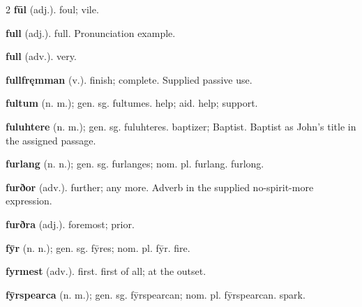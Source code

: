 \begin{multicols*}{2}
\textbf{fūl} (adj.). foul; vile.\par
\textbf{full} (adj.). full. Pronunciation example.\par
\textbf{full} (adv.). very.\par
\textbf{fullfręmman} (v.). finish; complete. Supplied passive use.\par
\textbf{fultum} (n. m.); gen. sg. fultumes. help; aid. help; support.\par
\textbf{fuluhtere} (n. m.); gen. sg. fuluhteres. baptizer; Baptist. Baptist as John's title in the assigned passage.\par
\textbf{furlang} (n. n.); gen. sg. furlanges; nom. pl. furlang. furlong.\par
\textbf{furðor} (adv.). further; any more. Adverb in the supplied no-spirit-more expression.\par
\textbf{furðra} (adj.). foremost; prior.\par
\textbf{fȳr} (n. n.); gen. sg. fȳres; nom. pl. fȳr. fire.\par
\textbf{fyrmest} (adv.). first. first of all; at the outset.\par
\textbf{fȳrspearca} (n. m.); gen. sg. fȳrspearcan; nom. pl. fȳrspearcan. spark.\par

\end{multicols*}

